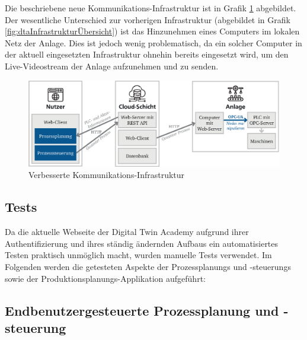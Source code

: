 Die beschriebene neue Kommunikations-Infrastruktur ist in Grafik \ref{fig:verbesserteKommunikationsInfrastruktur} abgebildet. Der wesentliche Unterschied zur vorherigen Infrastruktur (abgebildet in Grafik \ref{fig:dtaInfrastrukturÜbersicht}) ist das Hinzunehmen eines Computers im lokalen Netz der Anlage. Dies ist jedoch wenig problematisch, da ein solcher Computer in der aktuell eingesetzten Infrastruktur ohnehin bereits eingesetzt wird, um den Live-Videostream der Anlage aufzunehmen und zu senden.
%
\begin{figure}[htbp]
	\centering\includegraphics[width=1.0\textwidth]{images/06/verbesserteKommunikationsInfrastruktur.eps}
    \caption{Verbesserte Kommunikations-Infrastruktur}
    \label{fig:verbesserteKommunikationsInfrastruktur}
\end{figure}

\subsection{Tests}
\label{subsec:tests}

Da die aktuelle Webseite der Digital Twin Academy aufgrund ihrer Authentifizierung und ihres ständig ändernden Aufbaus ein automatisiertes Testen praktisch unmöglich macht, wurden manuelle Tests verwendet. Im Folgenden werden die getesteten Aspekte der Prozessplanungs und -steuerungs sowie der Produktionsplanungs-Applikation aufgeführt:

\subsection*{Endbenutzergesteuerte Prozessplanung und -steuerung}

